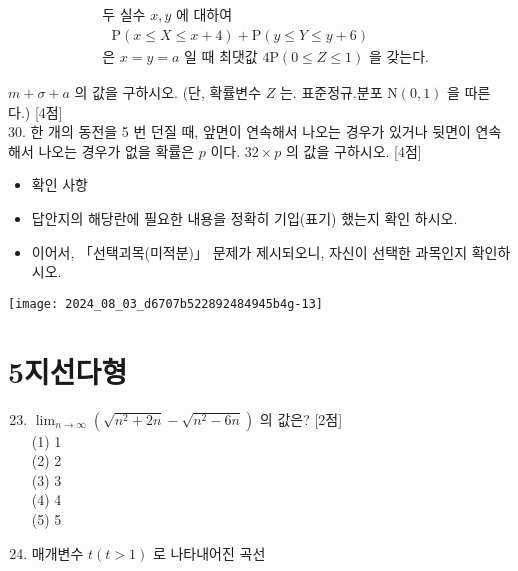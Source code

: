 \documentclass[10pt]{article}
\begin{document}
\[
\begin{aligned}
& \text { 두 실수 } x, y \text { 에 대하여 } \\
& \quad \mathrm{P}(x \leq X \leq x+4)+\mathrm{P}(y \leq Y \leq y+6) \\
& \text { 은 } x=y=a \text { 일 때 최댓값 } 4 \mathrm{P}(0 \leq Z \leq 1) \text { 을 갖는다. }
\end{aligned}
\]

\(m+\sigma+a\) 의 값을 구하시오. (단, 확률변수 \(Z\) 는. 표준정규.분포 \(\mathrm{N}(0,1)\) 을 따른다.) [4점]\\
30. 한 개의 동전을 5 번 던질 때, 앞면이 연속해서 나오는 경우가 있거나 뒷면이 연속해서 나오는 경우가 없을 확률은 \(p\) 이다. \(32 \times p\) 의 값을 구하시오. [4점]

\begin{itemize}
  \item 확인 사항
\end{itemize}

\begin{itemize}
  \item 답안지의 해당란에 필요한 내용을 정확히 기입(표기) 했는지 확인 하시오.

  \item 이어서, 「선택괴목(미적분)」 문제가 제시되오니, 자신이 선택한 과목인지 확인하시오.

\end{itemize}

\begin{center}
\texttt{[image: 2024\_08\_03\_d6707b522892484945b4g-13]}
\end{center}

\section*{5지선다형}
\begin{enumerate}
  \setcounter{enumi}{22}
  \item \(\lim _{n \rightarrow \infty}\left(\sqrt{n^{2}+2 n}-\sqrt{n^{2}-6 n}\right)\) 의 값은? [2점]\\
(1) 1\\
(2) 2\\
(3) 3\\
(4) 4\\
(5) 5

  \item 매개변수 \(t(t>1)\) 로 나타내어진 곡선

\end{enumerate}
\end{document}
